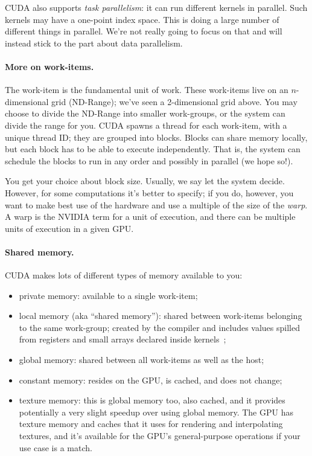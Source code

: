CUDA also supports \emph{task parallelism}: it can run different
kernels in parallel. Such kernels may have a one-point index space. This is
doing a large number of different things in parallel. We're not really going
to focus on that and will instead stick to the part about data parallelism.

\paragraph{More on work-items.} The work-item is the fundamental
unit of work. These work-items live on an $n$-dimensional
grid (ND-Range); we've seen a 2-dimensional grid above. You may choose
to divide the ND-Range into smaller work-groups, or the system can
divide the range for you. CUDA spawns a thread for each work-item,
with a unique thread ID; they are grouped into blocks. Blocks can share 
memory locally, but each block has to be able to execute independently.
That is, the system can schedule the blocks to run in any order and possibly
in parallel (we hope so!). 

You get your choice about block size. Usually, we say let the system decide. However, for some computations it's better to specify; if you do, however, you want to make best use of the hardware and use a multiple of the size of the \textit{warp}. A warp is the NVIDIA term for a unit of execution, and there can be multiple units of execution in a given GPU.

\paragraph{Shared memory.} CUDA makes lots of different types of
memory available to you:

\begin{itemize}
\item private memory: available to a single work-item;
\item local memory (aka ``shared memory''): shared between work-items
  belonging to the same work-group; created by the compiler and includes values spilled from registers and small arrays declared inside kernels~\cite{micikevicius11:_local_memor_regis_spill};
\item global memory: shared between all work-items as well as the host;
\item constant memory: resides on the GPU, is cached, and does not change;
\item texture memory: this is global memory too, also cached, and it provides potentially a very slight speedup over using global memory. The GPU has texture memory and caches that it uses for rendering and interpolating textures, and it's available for the GPU's general-purpose operations if your use case is a match. 
\end{itemize}

